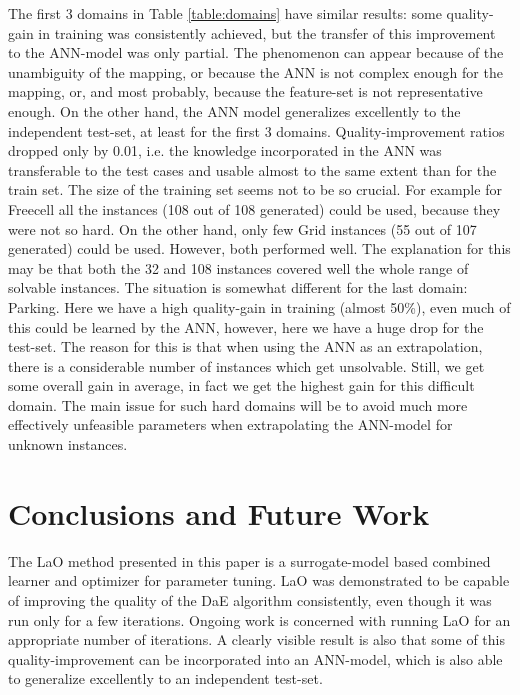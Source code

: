 \documentclass[runningheads,a4paper]{llncs}
\begin{document}
The first 3 domains in Table \ref{table:domains} have similar results: some quality-gain in training was consistently achieved, but the transfer of this improvement to the ANN-model was only partial. The phenomenon can appear because of the unambiguity of the mapping, or because the ANN is not complex enough for the mapping, or, and most probably, because the feature-set is not representative enough. On the other hand, the ANN model generalizes excellently to the independent test-set, at least for the first 3 domains. Quality-improvement ratios dropped only by 0.01, i.e. the knowledge incorporated in the ANN was transferable to the test cases and usable almost to the same extent than for the train set. The size of the training set seems not to be so crucial. For example for Freecell all the instances (108 out of 108 generated) could be used, because they were not so hard. On the other hand, only few  Grid instances (55 out of 107 generated) could be used. However, both performed well. The explanation for this may be that both the 32 and 108 instances covered well the whole range of solvable instances. 
The situation is somewhat different for the last domain: Parking. Here we have a high quality-gain in training (almost 50\%), even much of this could be learned by the ANN, however, here we have a huge drop for the test-set. The reason for this is that when using the ANN as an extrapolation, there is a considerable number of instances which get unsolvable. Still, we get some overall gain in average, in fact we get the highest gain for this difficult domain. The main issue for such hard domains will be to avoid much more effectively unfeasible parameters when extrapolating the ANN-model for unknown instances.

\section{Conclusions and Future Work}
\label{section:conclusions}
\label{section:futurework}	

The LaO method presented in this paper is a surrogate-model based combined learner and optimizer for parameter tuning. LaO was demonstrated to be capable of improving the quality of the DaE algorithm consistently, even though it was run only for a few iterations. Ongoing work is concerned with running LaO for an appropriate number of iterations. A clearly visible result is also that some of this quality-improvement can be incorporated into an ANN-model, which is also able to generalize excellently to an independent test-set.
\end{document}
